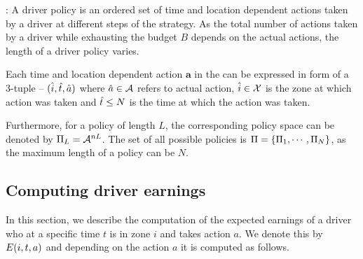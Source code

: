 
:
A driver policy is an ordered set of time and location dependent actions taken by a driver at different steps of the strategy. As the total number of actions taken by a driver while exhausting the budget $B$ depends on the actual actions, the length
of a driver policy {\policy} varies. 

Each time and location dependent action $\mathbf{a}$ in the {\policy} can be expressed in form of a 3-tuple -- $(\hat{i}, \hat{t}, \hat{a})$
where $\hat{a} \in \mathcal{A}$ refers to actual action, $\hat{i} \in \mathcal{X}$ is the zone at which action was taken and $\hat{t} \leq N$ is the 
time at which the action was taken.



Furthermore, for a policy of length $L$, the corresponding policy space can be denoted by
$\Pi_L = \mathcal{A}^{nL}$. The set of all possible policies is $\Pi = \{\Pi_1, \cdots, \Pi_N\}$, as the maximum length of a policy can be $N$.


\subsection{Computing driver earnings}
In this section, we describe the computation of the expected earnings of a driver
who at a specific time $t$ is in zone $i$ and takes action $a$. We denote this by 
$E({i},{t},{a})$ and depending on the action $a$ it is computed as follows.

